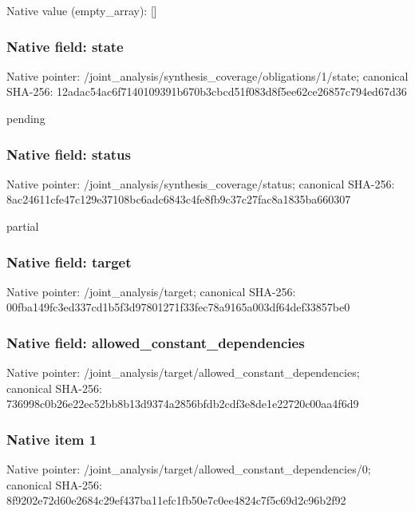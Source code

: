 \documentclass[10pt,a4paper]{article}
\begin{document}
Native value (empty\_\allowbreak{}array): []

\subsubsection{Native field: state}
Native pointer: /joint\_\allowbreak{}analysis/synthesis\_\allowbreak{}coverage/obligations/1/state; canonical SHA-256: 12adac54ac6f7140109391b670b3cbcd51f083d8f5ee62ce26857c794ed67d36

\begingroup\raggedright\sloppy pending\par\endgroup

\subsubsection{Native field: status}
Native pointer: /joint\_\allowbreak{}analysis/synthesis\_\allowbreak{}coverage/status; canonical SHA-256: 8ac24611cfe47c129e37108bc6adc6843c4fe8fb9c37c27fac8a1835ba660307

\begingroup\raggedright\sloppy partial\par\endgroup

\subsubsection{Native field: target}
Native pointer: /joint\_\allowbreak{}analysis/target; canonical SHA-256: 00fba149fc3ed337cd1b5f3d97801271f33fec78a9165a003df64def33857be0

\subsubsection{Native field: allowed\_\allowbreak{}constant\_\allowbreak{}dependencies}
Native pointer: /joint\_\allowbreak{}analysis/target/allowed\_\allowbreak{}constant\_\allowbreak{}dependencies; canonical SHA-256: 736998c0b26e22ec52bb8b13d9374a2856bfdb2cdf3e8de1e22720c00aa4f6d9

\subsubsection{Native item 1}
Native pointer: /joint\_\allowbreak{}analysis/target/allowed\_\allowbreak{}constant\_\allowbreak{}dependencies/0; canonical SHA-256: 8f9202e72d60e2684c29ef437ba11efc1fb50e7c0ee4824c7f5c69d2c96b2f92
\end{document}
